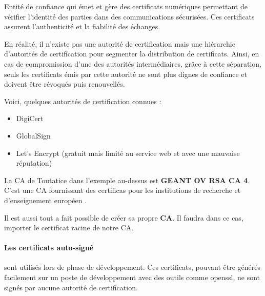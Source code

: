 \documentclass[french, 12pt]{article}%
\newcommand{\itemE}{\item[$\bullet$]}
\newcommand{\titreencadre}{Titre}
\newenvironment{encadre}[1]{\renewcommand{\titreencadre}{#1}
	\begin{mdframed}[style=encadrestyle]
	\vspace{0.5\baselineskip}
	}{%
	\end{mdframed}}
\newif\ifPROF
\begin{document}
\begin{encadre}{Autorité de certification (ou CA)}
Entité de confiance qui émet et gère des certificats numériques permettant de vérifier l'identité des parties dans des communications sécurisées. Ces certificats assurent l'authenticité et la fiabilité des échanges.
\end{encadre}

En réalité, il n'existe pas une autorité de certification mais une hiérarchie d'autorités de certification pour segmenter la distribution de certificats. Ainsi, en cas de compromission d'une des autorités intermédiaires, grâce à cette séparation, seuls les certificats émis par cette autorité ne sont plus dignes de confiance et doivent être révoqués puis renouvellés.

Voici, quelques autorités de certification connues : 
\begin{itemize}
\itemE DigiCert
\itemE GlobalSign
\itemE Let's Encrypt (gratuit mais limité au service web et avec une mauvaise réputation)
\end{itemize}

La CA de Toutatice dans l'exemple au-dessus est  \textbf{GEANT OV RSA CA 4}. C'est une CA fournissant des certificas pour les institutions de recherche et d'enseignement européen .

\vspace{0.5cm}

Il est aussi tout a fait possible de créer sa propre \textbf{CA}. Il faudra dans ce cas, importer le certificat racine de notre CA. 

\ifPROF
Exporter le certificat racine au format .crt :

Assurez-vous que le fichier my-ca.crt est accessible.
Ouvrir les paramètres de certificats dans Firefox :

Allez dans :
Menu → Paramètres → Confidentialité et sécurité → Section Certificats → Cliquez sur Afficher les certificats.
Importer votre certificat racine :

Dans l'onglet Autorités, cliquez sur Importer et sélectionnez le fichier my-ca.crt.
Lors de l'importation, cochez les cases pour faire confiance à cette CA pour :
Identifier les sites web.
Identifier les utilisateurs (si nécessaire).
\fi

\paragraph{Les certificats auto-signé} sont utilisés lors de phase de développement. Ces certificats, pouvant être générés facilement sur un poste de développement avec des outils comme openssl, ne sont signés par aucune autorité de certification.
\end{document}
